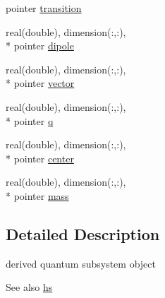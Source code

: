 \begin{DoxyCompactItemize}
pointer \hyperlink{structdipoles__class_1_1dipoles_a89dfcd300426c525f92d7ca048dfbfdb}{transition}
\item 
real(double), dimension(\+:,\+:), \\*
pointer \hyperlink{structdipoles__class_1_1dipoles_a6786ac3377ec10046d5a7bacf0b14da1}{dipole}
\item 
real(double), dimension(\+:,\+:), \\*
pointer \hyperlink{structdipoles__class_1_1dipoles_a658a483ea027a653fefdd02718773ea6}{vector}
\item 
real(double), dimension(\+:,\+:), \\*
pointer \hyperlink{structdipoles__class_1_1dipoles_ab97f9dcc84c8fafe029986f103d99630}{q}
\item 
real(double), dimension(\+:,\+:), \\*
pointer \hyperlink{structdipoles__class_1_1dipoles_ab7c31b6af230c4668d6fd24b359836bf}{center}
\item 
real(double), dimension(\+:,\+:), \\*
pointer \hyperlink{structdipoles__class_1_1dipoles_af9a15beeff0e1c4f47e28fc136fd9ea8}{mass}
\end{DoxyCompactItemize}


\subsection{Detailed Description}
derived quantum subsystem object 

\begin{DoxySeeAlso}{See also}
\hyperlink{structdipoles__class_1_1dipoles_afa2264f1ca48581328e2ab0e1745db4a}{hs} 
\end{DoxySeeAlso}


